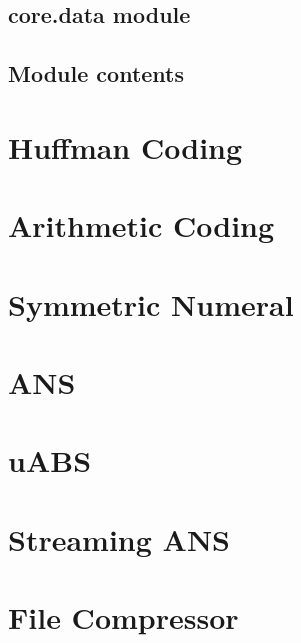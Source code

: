 \documentclass[letterpaper,10pt,english]{sphinxmanual}
\begin{document}
\subsection{core.data module}
\label{\detokenize{core:core-data-module}}

\subsection{Module contents}
\label{\detokenize{core:module-contents}}
\sphinxstepscope


\section{Huffman Coding}
\label{\detokenize{huffman:huffman-coding}}\label{\detokenize{huffman::doc}}
\sphinxstepscope


\section{Arithmetic Coding}
\label{\detokenize{arithmetic_coding:arithmetic-coding}}\label{\detokenize{arithmetic_coding::doc}}
\sphinxstepscope


\section{Symmetric Numeral}
\label{\detokenize{symmetric_numeral:symmetric-numeral}}\label{\detokenize{symmetric_numeral::doc}}
\sphinxstepscope


\section{ANS}
\label{\detokenize{ANS:ans}}\label{\detokenize{ANS::doc}}
\sphinxstepscope


\section{uABS}
\label{\detokenize{uABS:uabs}}\label{\detokenize{uABS::doc}}
\sphinxstepscope


\section{Streaming ANS}
\label{\detokenize{sANS:streaming-ans}}\label{\detokenize{sANS::doc}}
\sphinxstepscope


\section{File Compressor}
\label{\detokenize{file_compressor:file-compressor}}\label{\detokenize{file_compressor::doc}}
\sphinxstepscope
\end{document}
